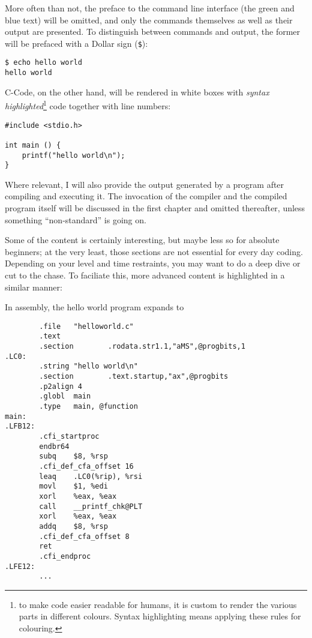More often than not, the preface to the command line interface (the green and blue text) will be omitted, and only the commands themselves as well as their output are presented. To distinguish between commands and output, the former will be prefaced with a Dollar sign (\texttt{\$}):

\begin{cmdbox}
\texttt{\$ echo hello world} \\
\texttt{hello world}
\end{cmdbox}

C-Code, on the other hand, will be rendered in white boxes with \emph{syntax highlighted}\footnote{to make code easier readable for humans, it is custom to render the various parts in different colours. Syntax highlighting means applying these rules for colouring.} code together with line numbers:
\begin{codebox}[C-Code]
\begin{verbatim}
#include <stdio.h>

int main () {
    printf("hello world\n");
}
\end{verbatim}
\end{codebox}

Where relevant, I will also provide the output generated by a program after compiling and executing it. The invocation of the compiler and the compiled program itself will be discussed in the first chapter and omitted thereafter, unless something \enquote{non-standard} is going on.

Some of the content is certainly interesting, but maybe less so for absolute beginners; at the very least, those sections are not essential for every day coding. Depending on your level and time restraints, you may want to do a deep dive or cut to the chase. To faciliate this, more advanced content is highlighted in a similar manner:
\begin{plusbox}
In assembly, the hello world program expands to
\begin{codebox}
\begin{verbatim}
        .file   "helloworld.c"
        .text
        .section        .rodata.str1.1,"aMS",@progbits,1
.LC0:
        .string "hello world\n"
        .section        .text.startup,"ax",@progbits
        .p2align 4
        .globl  main
        .type   main, @function
main:
.LFB12:
        .cfi_startproc
        endbr64
        subq    $8, %rsp
        .cfi_def_cfa_offset 16
        leaq    .LC0(%rip), %rsi
        movl    $1, %edi
        xorl    %eax, %eax
        call    __printf_chk@PLT
        xorl    %eax, %eax
        addq    $8, %rsp
        .cfi_def_cfa_offset 8
        ret
        .cfi_endproc
.LFE12:
        ...
\end{verbatim}
\end{codebox}
\end{plusbox}


